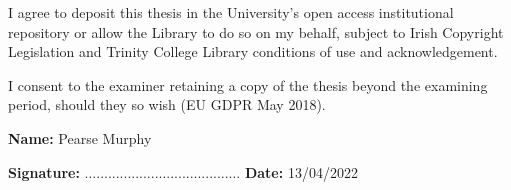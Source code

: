 \begin{declaration}      

%
%
%
I agree to deposit this thesis in the University's open access institutional repository or allow the Library to do so on my behalf, subject to Irish Copyright Legislation and Trinity College Library conditions of use and acknowledgement.

I consent to the examiner retaining a copy of the thesis beyond the examining period, should they so wish (EU GDPR May 2018). 

\vspace{30mm}

\textbf{Name:} Pearse Murphy

\vspace{15mm}

\textbf{Signature:}  ........................................		\textbf{Date:}  13/04/2022

\end{declaration}

\newpage
\thispagestyle{empty}
\mbox{}
